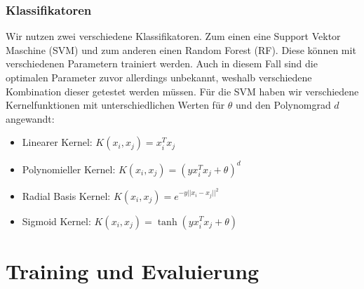 \subsubsection{Klassifikatoren}
Wir nutzen zwei verschiedene Klassifikatoren. Zum einen eine Support Vektor Maschine (SVM) und zum anderen einen Random Forest (RF).
Diese können mit verschiedenen Parametern trainiert werden. Auch in diesem Fall sind die optimalen Parameter zuvor allerdings unbekannt,
weshalb verschiedene Kombination dieser getestet werden müssen.\newline
Für die SVM haben wir verschiedene Kernelfunktionen mit unterschiedlichen
Werten für $\theta$ und den Polynomgrad $d$ angewandt:
\begin{itemize}
  \item Linearer Kernel: $K(x_i,x_j) = x_i^Tx_j$
  \item Polynomieller Kernel: $K(x_i,x_j) = (yx_i^Tx_j + \theta)^{d}$
  \item Radial Basis Kernel: $K(x_i,x_j) = e^{-y||x_i-x_j||^2}$
  \item Sigmoid Kernel: $K(x_i,x_j) = \tanh(yx_i^Tx_j + \theta)$
\end{itemize}



\section{Training und Evaluierung}
